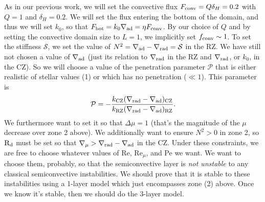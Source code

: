 \documentclass[onecolumn, amsmath, amsfonts, amssymb]{aastex62}
\newcommand{\grad}{\ensuremath{\nabla}}
\begin{document}
As in our previous work, we will set the convective flux $F_{\rm{conv}} = Q \delta_H = 0.2$ with $Q = 1$ and $\delta_H = 0.2$.
We will set the flux entering the bottom of the domain, and thus we will set $k_0$, so that $F_{\rm{bot}} = k_0 \grad_{\rm{ad}} = \eta F_{\rm{conv}}$.
By our choice of $Q$ and by setting the convective domain size to $L = 1$, we implicitly set $f_{\rm{conv}} \sim 1$.
To set the stiffness $\mathcal{S}$, we set the value of $N^2 = \grad_{\rm{ad}} - \grad_{\rm{rad}} = \mathcal{S}$ in the RZ.
We have still not chosen a value of $\grad_{\rm{ad}}$ (just its relation to $\grad_{\rm{rad}}$ in the RZ and $\grad_{\rm{rad}}$, or $k_0$, in the CZ).
So we will choose a value of the penetration parameter $\mathcal{P}$ that is either realistic of stellar values (1) or which has no penetration ($\ll 1$).
This parameter is
\begin{equation}
    \mathcal{P} = -\frac{k_{\rm{CZ}} (\grad_{\rm{rad}} - \grad_{\rm{ad}})_{\rm{CZ}}}
    {k_{\rm{RZ}} (\grad_{\rm{rad}} - \grad_{\rm{ad}})_{\rm{RZ}}}.
\end{equation}
We furthermore want to set it so that $\Delta \mu = 1$ (that's the magnitude of the $\mu$ decrease over zone 2 above).
We additionally want to ensure $N^2 > 0$ in zone 2, so $\rm{R}_d$ must be set so that $\grad_\mu > \grad_{\rm{rad}} - \grad_{\rm{ad}}$ in the CZ.
Under these constraints, we are free to choose whatever values of Re, Re$_\mu$, and Pe we want.
We want to choose them, probably, so that the semiconvective layer is \emph{not unstable} to any classical semiconvective instabilities.
We should prove that it is stable to these instabilities using a 1-layer model which just encompasses zone (2) above.
Once we know it's stable, then we should do the 3-layer model.
\end{document}
